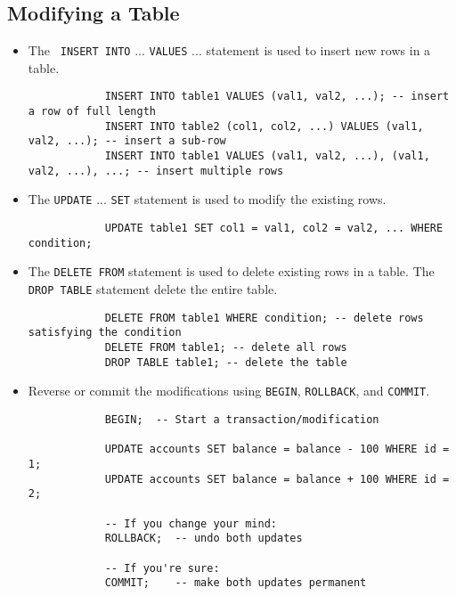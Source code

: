 \documentclass{article}
\begin{document}
	
	
	\subsection{Modifying a Table}
	
	\begin{itemize}
		\item The \texttt{\color{red} INSERT INTO} ... \texttt{\color{red}VALUES} ... statement is used to insert new rows in a table.
		
		\begin{lstlisting}
			INSERT INTO table1 VALUES (val1, val2, ...); -- insert a row of full length
			INSERT INTO table2 (col1, col2, ...) VALUES (val1, val2, ...); -- insert a sub-row
			INSERT INTO table1 VALUES (val1, val2, ...), (val1, val2, ...), ...; -- insert multiple rows
		\end{lstlisting}
		
		\item The \texttt{\color{red}UPDATE} ... \texttt{\color{red}SET} statement is used to modify the existing rows.
		
		\begin{lstlisting}
			UPDATE table1 SET col1 = val1, col2 = val2, ... WHERE condition;
		\end{lstlisting}
		
		\item The \texttt{\color{red}DELETE FROM} statement is used to delete existing rows in a table. The \texttt{\color{red}DROP TABLE} statement delete the entire table.
		
		\begin{lstlisting}
			DELETE FROM table1 WHERE condition; -- delete rows satisfying the condition
			DELETE FROM table1; -- delete all rows
			DROP TABLE table1; -- delete the table
		\end{lstlisting}
		
		\item Reverse or commit the modifications using \texttt{\color{red}BEGIN}, \texttt{\color{red}ROLLBACK}, and \texttt{\color{red}COMMIT}.
		
		\begin{lstlisting}
			BEGIN;  -- Start a transaction/modification
			
			UPDATE accounts SET balance = balance - 100 WHERE id = 1;
			UPDATE accounts SET balance = balance + 100 WHERE id = 2;
			
			-- If you change your mind:
			ROLLBACK;  -- undo both updates
			
			-- If you're sure:
			COMMIT;    -- make both updates permanent
		\end{lstlisting}
	\end{itemize}
	
\end{document}
